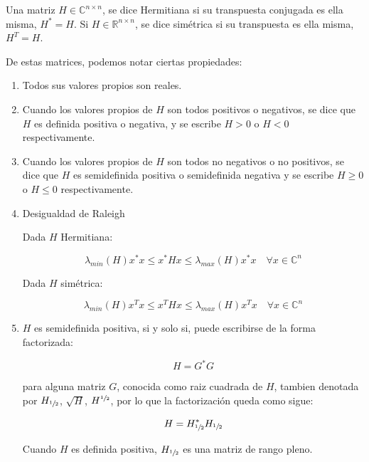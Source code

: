         \begin{nota}
            Una matriz $H \in \mathbb{C}^{n\times n}$, se dice Hermitiana si su transpuesta conjugada es ella misma, $H^* = H$.
            Si $H \in \mathbb{R}^{n \times n}$, se dice simétrica si su transpuesta es ella misma, $H^T = H$.

            De estas matrices, podemos notar ciertas propiedades:

            \begin{enumerate}
                \item Todos sus valores propios son reales.
                \item Cuando los valores propios de $H$ son todos positivos o negativos, se dice que $H$ es definida positiva o negativa, y se escribe $H > 0$ o $H < 0$ respectivamente.
                \item Cuando los valores propios de $H$ son todos no negativos o no positivos, se dice que $H$ es semidefinida positiva o semidefinida negativa y se escribe $H \ge 0$ o $H \le 0$ respectivamente.
                \item Desigualdad de Raleigh

                Dada $H$ Hermitiana:

                \begin{equation*}
                    \lambda_{min}(H) x^* x \le x^* H x \le \lambda_{max}(H) x^*x \quad \forall x \in \mathbb{C}^n
                \end{equation*}

                Dada $H$ simétrica:

                \begin{equation*}
                    \lambda_{min}(H) x^T x \le x^T H x \le \lambda_{max}(H) x^T x \quad \forall x \in \mathbb{C}^n
                \end{equation*}
                \item $H$ es semidefinida positiva, si y solo si, puede escribirse de la forma factorizada:

                \begin{equation*}
                    H = G^* G
                \end{equation*}

                para alguna matriz $G$, conocida como raiz cuadrada de $H$, tambien denotada por $H_{\sfrac{1}{2}}$, $\sqrt{H}$, $H^{\sfrac{1}{2}}$, por lo que la factorización queda como sigue:

                \begin{equation*}
                    H = H_{\sfrac{1}{2}}^* H_{\sfrac{1}{2}}
                \end{equation*}

                Cuando $H$ es definida positiva, $H_{\sfrac{1}{2}}$ es una matriz de rango pleno.
            \end{enumerate}
        \end{nota}

